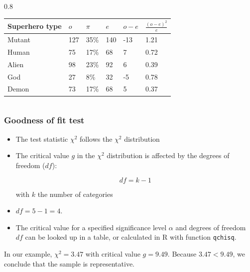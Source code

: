 \documentclass{beamer}
\begin{document}
\begin{frame}
\begin{columns}
    \begin{column} { 0.8 \textwidth}
\begin{table}[h]
\begin{tabular}{@{}llllll@{}}
\toprule
\textbf{Superhero type} & \textbf{$o$} & \textbf{$\pi$} & \textbf{$e$} & \textbf{$o -e$} & \textbf{$\frac{(o-e)^{2}}{e}$} \\ \midrule
Mutant                  & 127          & 35\%           & 140          & -13             & 1.21                           \\
Human                    & 75           & 17\%           & 68           & 7               & 0.72                           \\
Alien                   & 98           & 23\%           & 92           & 6               & 0.39                           \\
God                     & 27           & 8\%            & 32           & -5              & 0.78                           \\
Demon                   & 73           & 17\%           & 68           & 5               & 0.37                           \\ \bottomrule
\end{tabular}
\end{table}
    \end{column}
  \end{columns}
\end{frame}


\begin{frame}
  \frametitle{Goodness of fit test}

  \begin{itemize}
    \item The test statistic $\chi^{2}$ follows the $\chi^{2}$ distribution
    \item The critical value $g$ in the $\chi^{2}$ distribution is affected by the degrees of freedom ($df$):
      
      \[ df = k -1 \]
      
      with $k$ the number of categories
    \item $df = 5-1 = 4$.
    \item The critical value for a specified significance level $\alpha$ and degrees of freedom $df$ can be looked up in a table, or calculated in R with function \texttt{qchisq}.
  \end{itemize}

  In our example, $\chi^{2} = 3.47$ with critical value $g = 9.49$. Because $3.47 < 9.49$, we conclude that the sample is representative.
\end{frame}
\end{document}
